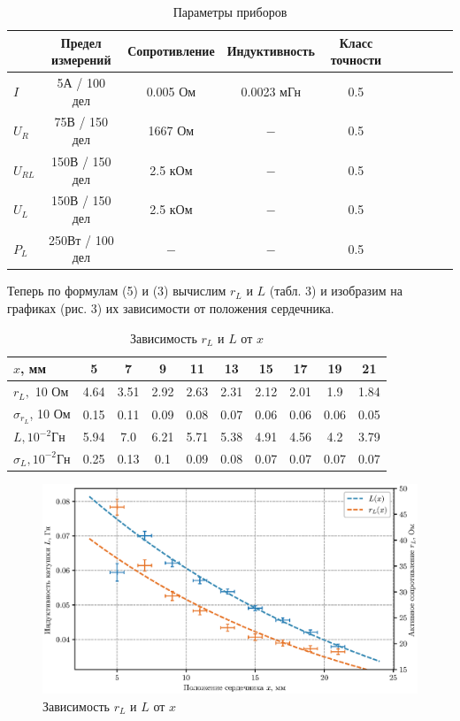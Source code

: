 \documentclass[12pt,a4paper]{article}
\begin{document}
\begin{table}[H]
	\centering
	\begin{tabular}{|l|c|c|c|c|c|c|c|c|c|}
	\hline
	 & Предел измерений & Сопротивление & Индуктивность & Класс точности\\ \hline
	$I$ & 5А / 100 дел & 0.005 Ом & 0.0023 мГн & 0.5\\ \hline
	$U_R$ &75В / 150 дел & 1667 Ом & $-$ & 0.5 \\ \hline
	$U_{RL}$ & 150В / 150 дел & 2.5 кОм & $-$ & 0.5 \\ \hline
	$U_L$ & 150В / 150 дел & 2.5 кОм & $-$ & 0.5 \\ \hline
	$P_L$ & 250Вт / 100 дел & $-$ & $-$ & 0.5\\ \hline
	\end{tabular}
	\caption{Параметры приборов}
\end{table}

Теперь по формулам (5) и (3) вычислим $r_L$ и $L$ (табл. 3) и изобразим на графиках (рис. 3) их зависимости от положения сердечника.

\begin{table}[H]
	\centering
	\begin{tabular}{|l|c|c|c|c|c|c|c|c|c|}
	\hline
	$x$, мм      & 5    & 7     & 9   & 11   & 13    & 15   & 17   & 19    & 21  \\ \hline
	$r_L,$ 10  Ом           & 4.64 & 3.51 & 2.92 & 2.63 & 2.31 & 2.12 & 2.01 & 1.9  & 1.84 \\ \hline
	$\sigma_{r_L}$, 10 Ом   & 0.15 & 0.11 & 0.09 & 0.08 & 0.07 & 0.06 & 0.06 & 0.06 & 0.05 \\ \hline
	$L, 10^{-2} Гн$         & 5.94 & 7.0  & 6.21 & 5.71 & 5.38 & 4.91 & 4.56 & 4.2  & 3.79 \\ \hline
	$\sigma_L, 10^{-2} Гн$ & 0.25 & 0.13 & 0.1  & 0.09 & 0.08 & 0.07 & 0.07 & 0.07 & 0.07 \\ \hline
	\end{tabular}
	\caption{Зависимость $r_L$ и $L$ от $x$}
\end{table}

\begin{figure}[H]
	\centering
	\includegraphics[width=\linewidth]{pics/LrL.eps}
	\caption{Зависимость $r_L$ и $L$ от $x$}
\end{figure}
\end{document}
